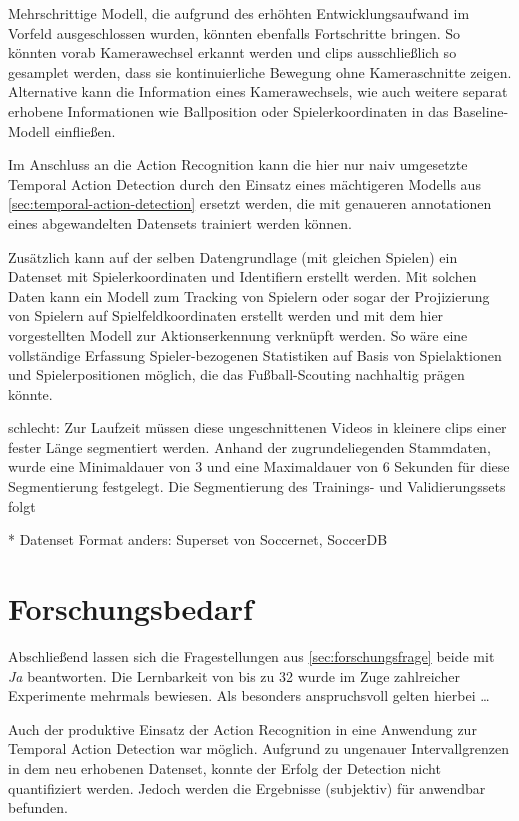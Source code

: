 Mehrschrittige Modell, die aufgrund des erhöhten Entwicklungsaufwand im Vorfeld ausgeschlossen wurden, könnten ebenfalls Fortschritte bringen.
So könnten \zB vorab Kamerawechsel erkannt werden und \glspl{clip} ausschließlich so gesamplet werden, dass sie kontinuierliche Bewegung ohne Kameraschnitte zeigen.
Alternative kann die Information eines Kamerawechsels, wie auch weitere separat erhobene Informationen wie Ballposition oder Spielerkoordinaten in das Baseline-Modell einfließen.

Im Anschluss an die Action Recognition kann die hier nur naiv umgesetzte Temporal Action Detection durch den Einsatz eines mächtigeren Modells aus \autoref{sec:temporal-action-detection} ersetzt werden, die mit genaueren \gls{annotationen} eines abgewandelten Datensets trainiert werden können.

Zusätzlich kann auf der selben Datengrundlage (mit gleichen Spielen) ein Datenset mit Spielerkoordinaten und Identifiern erstellt werden.
Mit solchen Daten kann \ggf ein Modell zum Tracking von Spielern oder sogar der Projizierung von Spielern auf Spielfeldkoordinaten erstellt werden und mit dem hier vorgestellten Modell zur Aktionserkennung verknüpft werden.
So wäre eine vollständige Erfassung Spieler-bezogenen Statistiken auf Basis von Spielaktionen und Spielerpositionen möglich, die das Fußball-Scouting nachhaltig prägen könnte.

schlecht:
Zur Laufzeit müssen diese ungeschnittenen Videos in kleinere \glspl{clip} einer fester Länge segmentiert werden.
Anhand der zugrundeliegenden Stammdaten, wurde eine Minimaldauer von 3 und eine Maximaldauer von 6 Sekunden für diese Segmentierung festgelegt.
Die Segmentierung des Trainings- und Validierungssets folgt

* Datenset Format anders: Superset von Soccernet, SoccerDB

\section{Forschungsbedarf}
\label{sec:fazit}

Abschließend lassen sich die Fragestellungen aus \autoref{sec:forschungsfrage} beide mit \emph{Ja} beantworten.
Die Lernbarkeit von bis zu 32 wurde im Zuge zahlreicher Experimente mehrmals bewiesen.
Als besonders anspruchsvoll gelten hierbei \dots


Auch der produktive Einsatz der Action Recognition in eine Anwendung zur Temporal Action Detection war möglich.
Aufgrund zu ungenauer Intervallgrenzen in dem neu erhobenen Datenset, konnte der Erfolg der Detection nicht quantifiziert werden.
Jedoch werden die Ergebnisse (subjektiv) für anwendbar befunden.

